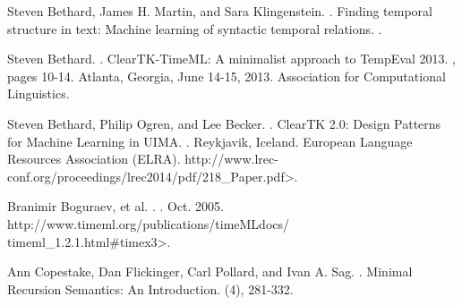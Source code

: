 \documentclass[11pt]{article}
\begin{document}
%

%
%

\begin{thebibliography}{}

Steven Bethard, James H. Martin, and Sara Klingenstein.
.
\newblock Finding temporal structure in text: Machine learning of syntactic temporal relations.
.

Steven Bethard.
.
\newblock ClearTK-TimeML: A minimalist approach to TempEval 2013.
, pages 10-14.
\newblock Atlanta, Georgia, June 14-15, 2013.
\newblock Association for Computational Linguistics.

Steven Bethard, Philip Ogren, and Lee Becker.
.
\newblock ClearTK 2.0: Design Patterns for Machine Learning in UIMA.
.
\newblock Reykjavik, Iceland.
\newblock European Language Resources Association (ELRA).
\newblock {\textless}http://www.lrec-conf.org/proceedings/lrec2014/pdf/218\_Paper.pdf{\textgreater}.

Branimir Boguraev, et al.
.
.
\newblock Oct. 2005.
\newblock {\textless}http://www.timeml.org/publications/timeMLdocs/\\timeml\_1.2.1.html\#timex3{\textgreater}.


Ann Copestake, Dan Flickinger, Carl Pollard, and Ivan A. Sag.
.
\newblock Minimal Recursion Semantics: An Introduction.
(4), 281-332.


\end{thebibliography}
\end{document}
